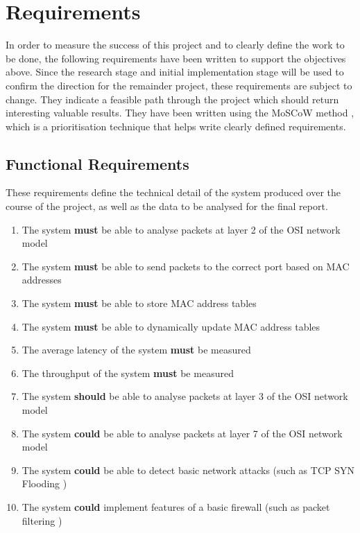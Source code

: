 \documentclass[12pt, a4paper, twoside, onecolumn]{article}
\begin{document}
\section{Requirements}
\label{requirements}
In order to measure the success of this project and to clearly define the work to be done, the following requirements have been written to support the objectives above. Since the research stage and initial implementation stage will be used to confirm the direction for the remainder project, these requirements are subject to change. They indicate a feasible path through the project which should return interesting valuable results. They have been written using the MoSCoW method \cite{moscow}, which is a prioritisation technique that helps write clearly defined requirements.

\subsection{Functional Requirements}
\label{functional_requirements}

These requirements define the technical detail of the system produced over the course of the project, as well as the data to be analysed for the final report.
\begin{enumerate}[label=\textbf{F\arabic*:}]
  \item The system \textbf{must} be able to analyse packets at layer 2 of the OSI network model
  \item The system \textbf{must} be able to send packets to the correct port based on MAC addresses
  \item The system \textbf{must} be able to store MAC address tables
  \item The system \textbf{must} be able to dynamically update MAC address tables
  \item The average latency of the system \textbf{must} be measured
  \item The throughput of the system \textbf{must} be measured
  \item The system \textbf{should} be able to analyse packets at layer 3 of the OSI network model
  \item The system \textbf{could} be able to analyse packets at layer 7 of the OSI network model
  \item The system \textbf{could} be able to detect basic network attacks (such as TCP SYN Flooding \cite{rfc4987})
  \item The system \textbf{could} implement features of a basic firewall (such as packet filtering \cite{rfc2979})
\end{enumerate}
\end{document}
